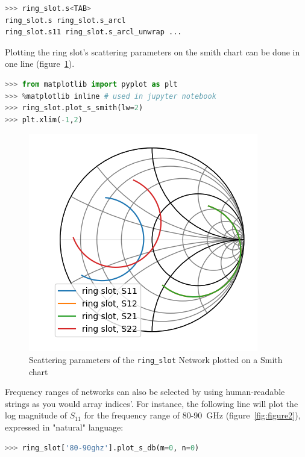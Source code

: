 \documentclass{IEEEjmw}
\begin{document}
\begin{lstlisting}[language=Python]
>>> ring_slot.s<TAB>
ring_slot.s ring_slot.s_arcl
ring_slot.s11 ring_slot.s_arcl_unwrap ...
\end{lstlisting}

Plotting the ring slot’s scattering parameters on the smith chart can be done in one line (figure~\ref{fig:figure1}).

\begin{lstlisting}[language=Python]
>>> from matplotlib import pyplot as plt
>>> %matplotlib inline # used in jupyter notebook
>>> ring_slot.plot_s_smith(lw=2)
>>> plt.xlim(-1,2)
\end{lstlisting}

\begin{figure}
	\centering
	\includegraphics[width=0.95\linewidth]{figures/figure1}
	\caption{Scattering parameters of the \texttt{ring\_slot} Network plotted on a Smith chart}
	\label{fig:figure1}
\end{figure}

Frequency ranges of networks can also be selected by using human-readable strings as you would array indices’. For instance, the following line will plot the log magnitude of $S_{11}$ for the frequency range of 80-90~GHz (figure~\ref{fig:figure2}), expressed in "natural" language:

\begin{lstlisting}[language=Python]
>>> ring_slot['80-90ghz'].plot_s_db(m=0, n=0)
\end{lstlisting}
\end{document}
